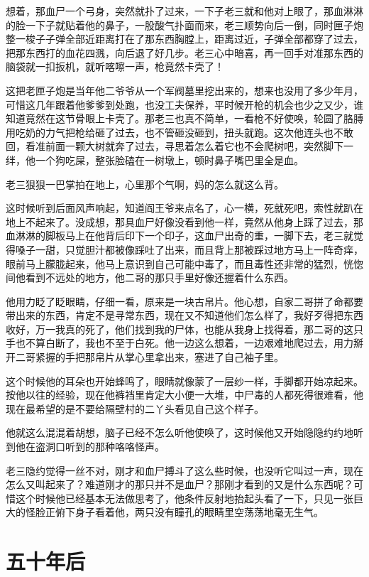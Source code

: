 想着，那血尸一个弓身，突然就扑了过来，一下子老三就和他对上眼了，那血淋淋的脸一下子就贴着他的鼻子，一股酸气扑面而来，老三顺势向后一倒，同时匣子炮整一梭子子弹全部近距离打在了那东西胸膛上，距离过近，子弹全部都穿了过去，把那东西打的血花四溅，向后退了好几步。老三心中暗喜，再一回手对准那东西的脑袋就一扣扳机，就听喀嚓一声，枪竟然卡壳了！

这把老匣子炮是当年他二爷爷从一个军阀墓里挖出来的，想来也没用了多少年月，可惜这几年跟着他爹爹到处跑，也没工夫保养，平时候开枪的机会也少之又少，谁知道竟然在这节骨眼上卡壳了。那老三也真不简单，一看枪不好使唤，轮圆了胳膊用吃奶的力气把枪给砸了过去，也不管砸没砸到，扭头就跑。这次他连头也不敢回，看准前面一颗大树就奔了过去，寻思着怎么着它也不会爬树吧，突然脚下一绊，他一个狗吃屎，整张脸磕在一树墩上，顿时鼻子嘴巴里全是血。

老三狠狠一巴掌拍在地上，心里那个气啊，妈的怎么就这么背。

这时候听到后面风声响起，知道阎王爷来点名了，心一横，死就死吧，索性就趴在地上不起来了。没成想，那具血尸好像没看到他一样，竟然从他身上踩了过去，那血淋淋的脚板马上在他背后印下一个印子，这血尸出奇的重，一脚下去，老三就觉得嗓子一甜，只觉胆汁都被像踩吐了出来，而且背上那被踩过地方马上一阵奇痒，眼前马上朦胧起来，他马上意识到自己可能中毒了，而且毒性还非常的猛烈，恍惚间他看到不远处的地方，他二哥的那只手里好像还握着什么东西。

他用力眨了眨眼睛，仔细一看，原来是一块古帛片。他心想，自家二哥拼了命都要带出来的东西，肯定不是寻常东西，现在又不知道他们怎么样了，我好歹得把东西收好，万一我真的死了，他们找到我的尸体，也能从我身上找得着，那二哥的这只手也不算白断了，我也不至于白死。他一边这么想着，一边艰难地爬过去，用力掰开二哥紧握的手把那帛片从掌心里拿出来，塞进了自己袖子里。

这个时候他的耳朵也开始蜂鸣了，眼睛就像蒙了一层纱一样，手脚都开始凉起来。按他以往的经验，现在他裤裆里肯定大小便一大堆，中尸毒的人都死得很难看，他现在最希望的是不要给隔壁村的二丫头看见自己这个样子。

他就这么混混着胡想，脑子已经不怎么听他使唤了，这时候他又开始隐隐约约地听到他在盗洞口听到的那种咯咯怪声。

老三隐约觉得一丝不对，刚才和血尸搏斗了这么些时候，也没听它叫过一声，现在怎么又叫起来了？难道刚才的那只并不是血尸？那刚才看到的又是什么东西呢？可惜这个时候他已经基本无法做思考了，他条件反射地抬起头看了一下，只见一张巨大的怪脸正俯下身子看着他，两只没有瞳孔的眼睛里空荡荡地毫无生气。

\chapter{五十年后}

